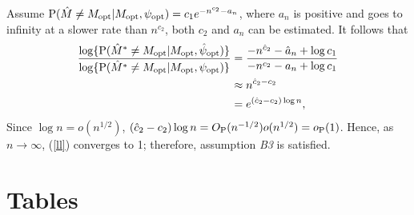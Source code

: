 \documentclass[10pt]{book}
\theoremstyle{definition}
\begin{document}
Assume ${\rm
 P}(\hat{M}\neq M_{\rm opt}|M_{\rm opt},\psi_{\rm opt}) = c_1e^{-n^{c_2}-a_n}$, where $a_n$ is positive and goes to infinity at a slower rate than $n^{c_2}$, both $c_2$ and $a_n$ can be estimated. It follows that
 \begin{equation}
\begin{aligned}[b]
 \frac{\log\{{\rm P}(\hat{M}^*\neq M_{\rm opt}|M_{\rm opt},\hat{\psi}_{\rm opt})\}}{\log\{{\rm
 P}(\hat{M}^*\neq M_{\rm opt}|M_{\rm opt},\psi_{\rm opt})\}}
 &=\frac{ - n^{\hat{c}_2}-\hat{a}_n+\log c_1}{ - n^{c_2}-a_n+\log c_1}\\
 &\approx n^{\hat{c}_2- c_2}\\
 &=e^{(\hat{c}_2- c_2)\log n}, 
 \end{aligned}\label{ll}
 \end{equation}
 Since $\log n =o(n^{1/2})$, $(\hat{c}_2- c_2)\log n= O_{\rm P}(n^{-1/2})o(n^{1/2})= o_{\rm P}(1)$. Hence, as $n\rightarrow\infty$, (\ref{ll}) converges to 1; therefore, assumption {\it B3} is satisfied.
 \section{Tables}
 
\end{document}
